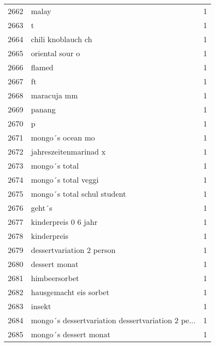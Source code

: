 \begin{tabular}{llr}
2662 &                                              malay &      1 \\
2663 &                                                  t &      1 \\
2664 &                                 chili knoblauch ch &      1 \\
2665 &                                    oriental sour o &      1 \\
2666 &                                             flamed &      1 \\
2667 &                                                 ft &      1 \\
2668 &                                        maracuja mm &      1 \\
2669 &                                             panang &      1 \\
2670 &                                                  p &      1 \\
2671 &                                   mongo´s ocean mo &      1 \\
2672 &                              jahreszeitenmarinad x &      1 \\
2673 &                                      mongo´s total &      1 \\
2674 &                                mongo´s total veggi &      1 \\
2675 &                        mongo´s total schul student &      1 \\
2676 &                                             geht´s &      1 \\
2677 &                               kinderpreis 0 6 jahr &      1 \\
2678 &                                        kinderpreis &      1 \\
2679 &                          dessertvariation 2 person &      1 \\
2680 &                                      dessert monat &      1 \\
2681 &                                      himbeersorbet &      1 \\
2682 &                             hausgemacht eis sorbet &      1 \\
2683 &                                             insekt &      1 \\
2684 &  mongo´s dessertvariation dessertvariation 2 pe... &      1 \\
2685 &                              mongo´s dessert monat &      1 \\

\end{tabular}
